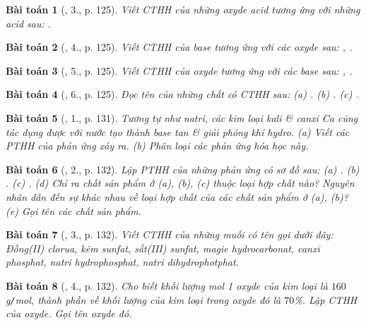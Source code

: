 \documentclass{article}
\newtheorem{baitoan}{Bài toán}
\begin{document}
\begin{baitoan}[\cite{SGK_Hoa_Hoc_8}, 3., p. 125]
	Viết CTHH của những oxyde acid tương ứng với những acid sau: \emph{}.
\end{baitoan}

\begin{baitoan}[\cite{SGK_Hoa_Hoc_8}, 4., p. 125]
	Viết CTHH của base tương ứng với các oxyde sau: \emph{, }.
\end{baitoan}

\begin{baitoan}[\cite{SGK_Hoa_Hoc_8}, 5., p. 125]
	Viết CTHH của oxyde tương ứng với các base sau: \emph{, }.
\end{baitoan}

\begin{baitoan}[\cite{SGK_Hoa_Hoc_8}, 6., p. 125]
	Đọc tên của những chất có CTHH sau: (a) \emph{}. (b) \emph{}. (c) \emph{}.
\end{baitoan}

\begin{baitoan}[\cite{SGK_Hoa_Hoc_8}, 1., p. 131]
	Tương tự như natri, các kim loại kali \& canxi \emph{Ca} cũng tác dụng được với nước tạo thành base tan \& giải phóng khí hydro. (a) Viết các PTHH của phản ứng xảy ra. (b) Phân loại các phản ứng hóa học này.
\end{baitoan}

\begin{baitoan}[\cite{SGK_Hoa_Hoc_8}, 2., p. 132]
	Lập PTHH của những phản ứng có sơ đồ sau: (a) \emph{}. (b) \emph{}. (c) \emph{}. (d) Chỉ ra chất sản phẩm ở (a), (b), (c) thuộc loại hợp chất nào? Nguyên nhân dẫn đến sự khác nhau về loại hợp chất của các chất sản phẩm ở (a), (b)? (e) Gọi tên các chất sản phẩm.
\end{baitoan}

\begin{baitoan}[\cite{SGK_Hoa_Hoc_8}, 3., p. 132]
	Viết CTHH của những muối có tên gọi dưới đây: Đồng(II) clorua, kẽm sunfat, sắt(III) sunfat, magie hydrocarbonat, canxi phosphat, natri hydrophosphat, natri dihydrophotphat.
\end{baitoan}

\begin{baitoan}[\cite{SGK_Hoa_Hoc_8}, 4., p. 132]
	Cho biết khối lượng mol 1 oxyde của kim loại là $160$\emph{g\texttt{/}mol}, thành phần về khối lượng của kim loại trong oxyde đó là $70$\%. Lập CTHH của oxyde. Gọi tên oxyde đó.
\end{baitoan}
\end{document}
